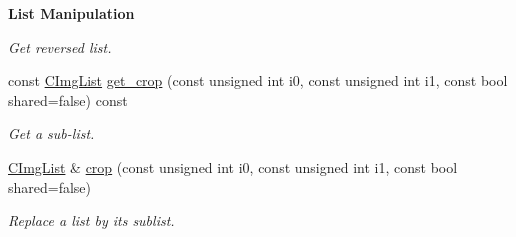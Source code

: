 \begin{Indent}{\bf List Manipulation}
\begin{DoxyCompactItemize}
\begin{DoxyCompactList}\small\item\em Get reversed list. \item\end{DoxyCompactList}\item 
\hypertarget{structcimg__library_1_1_c_img_list_ae64b195f47bba8d6e8d283831cd1e918}{
const \hyperlink{structcimg__library_1_1_c_img_list}{CImgList} \hyperlink{structcimg__library_1_1_c_img_list_ae64b195f47bba8d6e8d283831cd1e918}{get\_\-crop} (const unsigned int i0, const unsigned int i1, const bool shared=false) const }
\label{structcimg__library_1_1_c_img_list_ae64b195f47bba8d6e8d283831cd1e918}

\begin{DoxyCompactList}\small\item\em Get a sub-\/list. \item\end{DoxyCompactList}\item 
\hypertarget{structcimg__library_1_1_c_img_list_a625b4a9c8940a92a22b43ddd3ea4ee0a}{
\hyperlink{structcimg__library_1_1_c_img_list}{CImgList} \& \hyperlink{structcimg__library_1_1_c_img_list_a625b4a9c8940a92a22b43ddd3ea4ee0a}{crop} (const unsigned int i0, const unsigned int i1, const bool shared=false)}
\label{structcimg__library_1_1_c_img_list_a625b4a9c8940a92a22b43ddd3ea4ee0a}

\begin{DoxyCompactList}\small\item\em Replace a list by its sublist. \item\end{DoxyCompactList}\end{DoxyCompactItemize}
\end{Indent}
